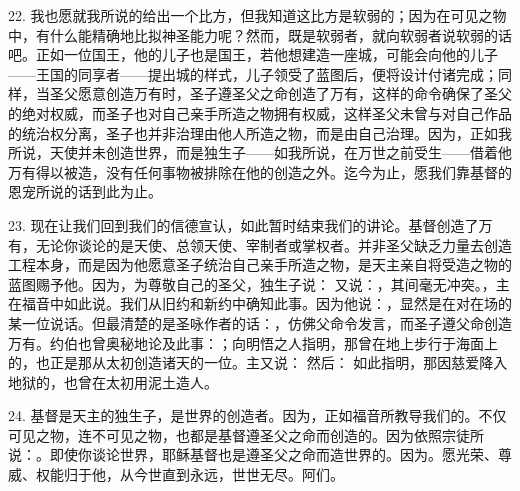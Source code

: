 22. 我也愿就我所说的给出一个比方，但我知道这比方是软弱的；因为在可见之物中，有什么能精确地比拟神圣能力呢？然而，既是软弱者，就向软弱者说软弱的话吧。正如一位国王，他的儿子也是国王，若他想建造一座城，可能会向他的儿子——王国的同享者——提出城的样式，儿子领受了蓝图后，便将设计付诸完成；同样，当圣父愿意创造万有时，圣子遵圣父之命创造了万有，这样的命令确保了圣父的绝对权威，而圣子也对自己亲手所造之物拥有权威，这样圣父未曾与对自己作品的统治权分离，圣子也并非治理由他人所造之物，而是由自己治理。因为，正如我所说，天使并未创造世界，而是独生子——如我所说，在万世之前受生——借着他万有得以被造，没有任何事物被排除在他的创造之外。迄今为止，愿我们靠基督的恩宠所说的话到此为止。\par

23. 现在让我们回到我们的信德宣认，如此暂时结束我们的讲论。基督创造了万有，无论你谈论的是天使、总领天使、宰制者或掌权者。并非圣父缺乏力量去创造工程本身，而是因为他愿意圣子统治自己亲手所造之物，是天主亲自将受造之物的蓝图赐予他。因为，为尊敬自己的圣父，独生子说： 又说：，其间毫无冲突。，主在福音中如此说。我们从旧约和新约中确知此事。因为他说：，显然是在对在场的某一位说话。但最清楚的是圣咏作者的话：，仿佛父命令发言，而圣子遵父命创造万有。约伯也曾奥秘地论及此事：；向明悟之人指明，那曾在地上步行于海面上的，也正是那从太初创造诸天的一位。主又说： 然后： 如此指明，那因慈爱降入地狱的，也曾在太初用泥土造人。\par

24. 基督是天主的独生子，是世界的创造者。因为，正如福音所教导我们的。不仅可见之物，连不可见之物，也都是基督遵圣父之命而创造的。因为依照宗徒所说：。即使你谈论世界，耶稣基督也是遵圣父之命而造世界的。因为。愿光荣、尊威、权能归于他，从今世直到永远，世世无尽。阿们。\par


